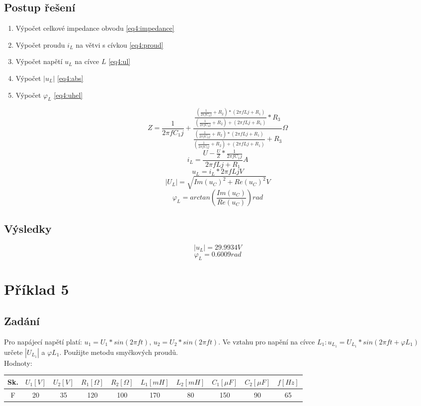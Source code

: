 \documentclass[12pt,a4paper,titlepage,final]{article}
\begin{document}
\subsection{Postup řešení}
\begin{enumerate}
\item Výpočet celkové impedance obvodu \ref{eq4:impedance}
\item Výpočet proudu $i_L$ na větvi s cívkou \ref{eq4:proud}
\item Výpočet napětí $u_L$ na cívce $L$ \ref{eq4:ul}
\item Výpočet $|u_L|$ \ref{eq4:abs}
\item Výpočet $\varphi_L$ \ref{eq4:uhel}
\end{enumerate}
\newcommand{\ctvrtyImpCjedna}{\ensuremath{\frac{1}{2\pi f C_1 j}}}
\newcommand{\ctvrtyImpCdva}{\ensuremath{\frac{1}{2\pi f C_2 j}}}
\newcommand{\ctvrtyImpL}{\ensuremath{2\pi f L j}}
\newcommand{\ctvrtyParL}{\ensuremath{\frac{(\ctvrtyImpCdva+R_2)*(\ctvrtyImpL+R_1)}{(\ctvrtyImpCdva+R_2)+(\ctvrtyImpL+R_1)}}}
\begin{equation}\label{eq4:impedance}
Z = \ctvrtyImpCjedna + \frac{\ctvrtyParL * R_3}{\ctvrtyParL + R_3}\Omega
\end{equation}
\begin{equation}\label{eq4:proud}
i_L = \frac{U - \frac{U}{Z}*\ctvrtyImpCjedna}{\ctvrtyImpL+R_1}A
\end{equation}
\begin{equation}\label{eq4:ul}
u_L = i_L*\ctvrtyImpL V
\end{equation}
\begin{equation}\label{eq4:abs}
|U_L| = \sqrt{Im(u_C)^2+Re(u_C)^2} V
\end{equation}
\begin{equation}\label{eq4:uhel}
\varphi_L = arctan(\frac{Im(u_C)}{Re(u_C)})rad
\end{equation}
\subsection{Výsledky}
\[|u_L| = 29.9934V\]
\[\varphi_L = 0.6009rad\]

\section{Příklad 5}
\subsection{Zadání}
Pro napájecí napětí platí: $u_1=U_1*sin(2\pi f t)$, $u_2=U_2*sin(2\pi f t)$.
Ve vztahu pro napění na cívce $L_1:u_{L_1}=U_{L_1}*sin(2\pi f t + \varphi L_1)$ 
určete $|U_{L_1}|$ a $\varphi L_1$. Použijte metodu smyčkových proudů.\\
Hodnoty:\\
\begin{tabular}{|c|c|c|c|c|c|c|c|c|c|}
\hline
Sk. & $U_1 [V]$ & $U_2 [V]$ & $R_1 [\Omega]$ & $R_2 [\Omega]$ & $L_1[mH]$ & $L_2[mH]$ & $C_1 [\mu F]$ & $C_2 [\mu F]$ & $f [Hz]$\\
\hline
F & 20 & 35 & 120 & 100 & 170 & 80 & 150 & 90 & 65\\
\hline
\end{tabular}
\end{document}
